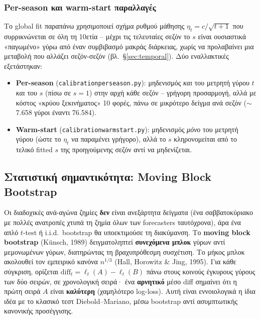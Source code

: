 \documentclass[11pt,a4paper]{article}
\newcommand{\file}[1]{\texttt{#1}}
\renewcommand{\_}{\oldunderscore\allowbreak}
\begin{document}
\subsubsection{Per-season και warm-start παραλλαγές}

Το global fit παραπάνω χρησιμοποιεί σχήμα ρυθμού μάθησης $\eta_t = c/\sqrt{t+1}$ που
συρρικνώνεται σε όλη τη 10ετία -- μέχρι τις τελευταίες σεζόν το $s$ είναι ουσιαστικά
«παγωμένο» γύρω από έναν συμβιβασμό μακράς διάρκειας, χωρίς να προλαβαίνει μια μεταβολή
που αλλάζει σεζόν-σεζόν (βλ.~\S\ref{sec:temporal}). Δύο εναλλακτικές εξετάστηκαν:
\begin{itemize}
  \item \textbf{Per-season} (\file{calibration\_per\_season.py}): μηδενισμός \emph{και} του
        μετρητή γύρου $t$ \emph{και} του $s$ (πίσω σε $s=1$) στην αρχή κάθε σεζόν --
        γρήγορη προσαρμογή, αλλά με κόστος «κρύου ξεκινήματος» 10 φορές, πάνω σε
        μικρότερο δείγμα ανά σεζόν ($\sim$7.658 γύροι έναντι 76.584).
  \item \textbf{Warm-start} (\file{calibration\_warmstart.py}): μηδενισμός \emph{μόνο} του
        μετρητή γύρου (ώστε το $\eta_t$ να παραμένει γρήγορο), αλλά το $s$ κληρονομείται
        από το τελικό fitted $s$ της προηγούμενης σεζόν αντί να μηδενίζεται.
\end{itemize}

\subsection{Στατιστική σημαντικότητα: Moving Block Bootstrap}
\label{sec:bootstrap-theory}

Οι διαδοχικές ανά-αγώνα ζημίες \textbf{δεν} είναι ανεξάρτητα δείγματα (ένα σαββατοκύριακο
με πολλές ανατροπές χτυπά τη ζημία όλων των forecasters ταυτόχρονα), άρα ένα απλό
$t$-test ή i.i.d.\ bootstrap θα υποεκτιμούσε τη διακύμανση. Το \textbf{moving block
bootstrap} (Künsch, 1989) δειγματοληπτεί \textbf{συνεχόμενα μπλοκ} γύρων αντί μεμονωμένων
γύρων, διατηρώντας τη βραχυπρόθεσμη συσχέτιση. Το μήκος μπλοκ ακολουθεί τον εμπειρικό
κανόνα $n^{1/3}$ (Hall, Horowitz \& Jing, 1995). Για κάθε σύγκριση, ορίζεται
$\text{diff}_t = \ell_t(A) - \ell_t(B)$ πάνω στους κοινούς έγκυρους γύρους των δύο σειρών,
σε χρονολογική σειρά· ένα \textbf{αρνητικό} μέσο diff σημαίνει ότι η πρώτη σειρά $A$ είναι
\textbf{καλύτερη} (χαμηλότερο log-loss). Αυτή είναι εννοιολογικά η ίδια ιδέα με το κλασικό
τεστ Diebold--Mariano, μέσω bootstrap αντί ασυμπτωτικής κανονικής προσέγγισης.
\end{document}
